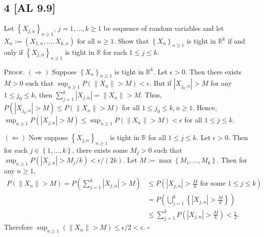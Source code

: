 \documentclass[12pt]{article}
\newcounter{ProofCounter}
\newenvironment{Proof}{\stepcounter{ProofCounter}\textsc{Proof.}}{\hfill$\square$}
\begin{document}
\subsection*{4 [AL 9.9]}
\begin{tcolorbox}
Let $\left\{ X_{j,n} \right\}_{n\geq 1}$, $j = 1, \hdots, k \geq 1$ be sequence of random variables and let $X_{n} := \left( X_{1,n}, \hdots, X_{k,n}
\right)$ for all $n \geq 1$. Show that $\left\{ X_{n} \right\}_{n\geq 1}$ is tight in $\mathbb{R}^{k}$ if and only if $\left\{ X_{j,n} \right\}_{n\geq
1}$ is tight in $\mathbb{R}$ for each $1 \leq j \leq k$.
\end{tcolorbox}
\begin{Proof}
$(\Rightarrow)$ Suppose $\left\{ X_{n} \right\}_{n\geq 1}$ is tight in $\mathbb{R}^{k}$. Let $\epsilon > 0$. Then there exists $M > 0$ such that 
$\sup_{n\geq 1}P(\|X_{n}\| > M) < \epsilon$. But if $|X_{j_0,n}| > M$ for any $1 \leq j_0 \leq k$, then $\sum_{j=1}^{k}|X_{j,n}| = \|X_n\| > M$. Thus,
$P\left( |X_{j_0,n}| > M \right) \leq P\left( \|X_{n}\| > M \right)$ for all $1 \leq j_0 \leq k, n \geq 1$. 
Hence, $\sup_{n\geq 1}P\left( |X_{j,n}| > M \right) \leq \sup_{n\geq 1}P(\|X_n\| > M) < \epsilon$ for all $1 \leq j \leq k$.

$(\Leftarrow)$ Now suppose $\left\{ X_{j,n} \right\}_{n\geq 1}$ is tight in $\mathbb{R}$ for all $1 \leq j \leq k$. Let $\epsilon > 0$. Then for each
$j \in \left\{ 1,\hdots, k \right\}$, there exists some $M_j > 0$ such that $\sup_{n\geq 1}P(|X_{j,n}| > M_j / k) < \epsilon / (2k)$. Let $M :=
\max\left\{ M_{1}, \hdots, M_{k} \right\}$. Then for any $n \geq 1$,
\begin{align*}
P(\|X_n\| > M) = P\left( \sum_{j=1}^{k}|X_{j,n}| > M \right) & \leq P\left( |X_{j,n}| > \frac{M}{k}\text{ for some } 1 \leq j \leq k \right) \\
& = P\left( \bigcup_{j=1}^{k}\left\{ |X_{j,n}| > \frac{M}{k} \right\} \right) \\
& \leq \sum_{j=1}^{k}P\left(|X_{j,n}| > \frac{M}{k}\right) < \frac{\epsilon}{2}.
\end{align*}
Therefore $\sup_{n\geq 1}(\|X_{n}\| > M) \leq \epsilon / 2 < \epsilon$.
\end{Proof}
\end{document}

